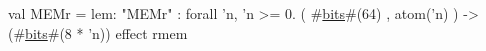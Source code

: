 val MEMr = {lem: "MEMr"} : forall 'n, 'n >= 0.
  ( #\hyperref[zbits]{bits}#(64) , atom('n) ) -> (#\hyperref[zbits]{bits}#(8 * 'n)) effect { rmem }
